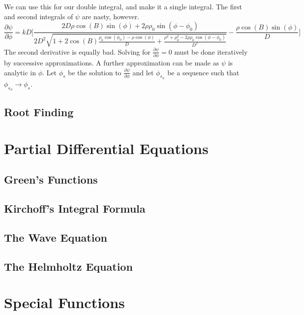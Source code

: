 \documentclass[crop=false,class=book,oneside]{standalone}
\begin{document}
            We can use this for our double integral,
            and make it a single integral. The first and
            second integrals of $\psi$ are nasty, however.
            \begin{equation}
                \frac{\partial \psi}
                     {\partial \phi}
                =kD\Big[\frac{2D\rho\cos(B)\sin(\phi)+2\rho\rho_{0}
                \sin(\phi-\phi_{0})}{2D^2\sqrt{1+2\cos(B)
                \frac{\rho_{0}\cos(\phi_{0})-\rho\cos(\phi)}{D}+
                \frac{\rho^{2}+\rho_{0}^{2}-
                2\rho\rho_{0}\cos(\phi-\phi_{0})}{D^2}}}-
                \frac{\rho\cos(B)\sin(\phi)}{D}\Big]
            \end{equation}
            The second derivative is equally bad.
            Solving for $\frac{\partial\psi}{\partial\phi}=0$
            must be done iteratively by successive approximations.
            A further approximation can be made as $\psi$
            is analytic in $\phi$. Let $\phi_{s}$ be
            the solution to $\frac{\partial\psi}{\partial\phi}$
            and let $\phi_{s_{n}}$ be a sequence such that
            $\phi_{s_{n}}\rightarrow\phi_{s}$.
        \subsection{Root Finding}
    \section{Partial Differential Equations}
        \subsection{Green's Functions}
        \subsection{Kirchoff's Integral Formula}
        \subsection{The Wave Equation}
        \subsection{The Helmholtz Equation}
    \section{Special Functions}
\end{document}
